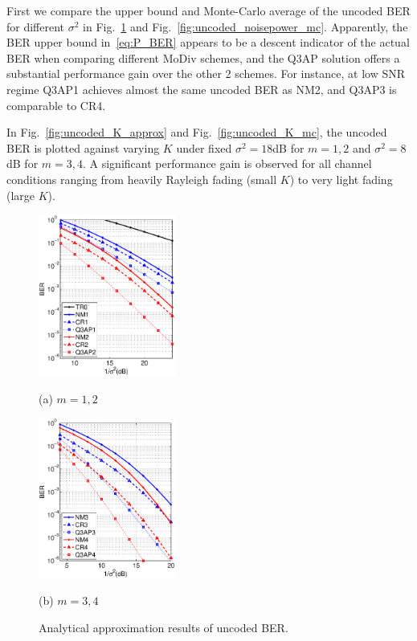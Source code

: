 \documentclass[journal]{IEEEtran}
\begin{document}
First we compare the upper bound and Monte-Carlo average of the uncoded BER for
different $\sigma^2$ in Fig.~\ref{fig:uncoded_noisepower_approx} and 
Fig.~\ref{fig:uncoded_noisepower_mc}.
Apparently, the BER upper bound in~\eqref{eq:P_BER} appears to be a descent
indicator of the actual BER when comparing different MoDiv schemes, and the Q3AP
solution offers a substantial performance gain over the other 2 schemes. For
instance, at low SNR regime Q3AP1 achieves almost the same uncoded BER as NM2,
and Q3AP3 is comparable to CR4.

In Fig.~\ref{fig:uncoded_K_approx} and Fig.~\ref{fig:uncoded_K_mc}, the uncoded
BER is plotted against varying $K$ under fixed $\sigma^2 = 18$dB for $m=1,2$ and 
$\sigma^2 = 8$dB for $m=3,4$. A significant performance gain is observed for all
channel conditions ranging from heavily Rayleigh fading (small $K$) to very
light fading (large $K$).
\begin{figure}[!t]
  \begin{minipage}[b]{.48\linewidth}
    \centering
    \centerline{\includegraphics[width=4.5cm]{./figs/BER_noise_power_upperbound_64QAM_12.eps}}
    \centerline{(a) $m=1,2$}\medskip
  \end{minipage}
  \hfill
  \begin{minipage}[b]{0.48\linewidth}
    \centering
    \centerline{\includegraphics[width=4.5cm]{./figs/BER_noise_power_upperbound_64QAM_34.eps}}
    \centerline{(b) $m=3,4$}\medskip
  \end{minipage}
  \vspace{-10pt}
  \caption{Analytical approximation results of uncoded BER.}
  \label{fig:uncoded_noisepower_approx}
\end{figure}
\end{document}
